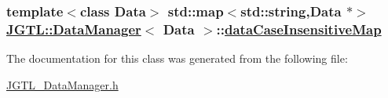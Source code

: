 \hypertarget{class_j_g_t_l_1_1_data_manager_a4e97afca438785863a86a20898130b0}{
\subsubsection[dataCaseInsensitiveMap]{\setlength{\rightskip}{0pt plus 5cm}template$<$class Data$>$ std::map$<$std::string,Data $\ast$$>$ \hyperlink{class_j_g_t_l_1_1_data_manager}{JGTL::Data\-Manager}$<$ Data $>$::\hyperlink{class_j_g_t_l_1_1_data_manager_a4e97afca438785863a86a20898130b0}{data\-Case\-Insensitive\-Map}}}
\label{class_j_g_t_l_1_1_data_manager_a4e97afca438785863a86a20898130b0}




The documentation for this class was generated from the following file:\begin{CompactItemize}
\item 
\hyperlink{_j_g_t_l___data_manager_8h}{JGTL\_\-Data\-Manager.h}\end{CompactItemize}

